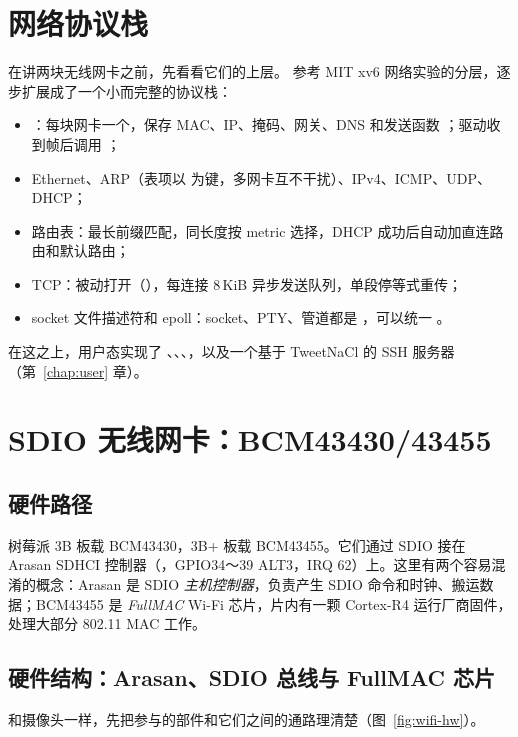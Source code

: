 \section{网络协议栈}

在讲两块无线网卡之前，先看看它们的上层。 参考 MIT xv6 网络实验的分层，逐步扩展成了一个小而完整的协议栈：

\begin{itemize}
  \item {}：每块网卡一个，保存 MAC、IP、掩码、网关、DNS 和发送函数 ；驱动收到帧后调用 ；
  \item Ethernet、ARP（表项以  为键，多网卡互不干扰）、IPv4、ICMP、UDP、DHCP；
  \item 路由表：最长前缀匹配，同长度按 metric 选择，DHCP 成功后自动加直连路由和默认路由；
  \item TCP：被动打开（），每连接 8\,KiB 异步发送队列，单段停等式重传；
  \item socket 文件描述符和 epoll：socket、PTY、管道都是 ，可以统一 。
\end{itemize}

在这之上，用户态实现了 、、、，以及一个基于 TweetNaCl 的 SSH 服务器（第~\ref{chap:user} 章）。

\section{SDIO 无线网卡：BCM43430/43455}

\subsection{硬件路径}

树莓派 3B 板载 BCM43430，3B+ 板载 BCM43455。它们通过 SDIO 接在 Arasan SDHCI 控制器（，GPIO34～39 ALT3，IRQ 62）上。这里有两个容易混淆的概念：Arasan 是 SDIO \emph{主机控制器}，负责产生 SDIO 命令和时钟、搬运数据；BCM43455 是 \emph{FullMAC} Wi-Fi 芯片，片内有一颗 Cortex-R4 运行厂商固件，处理大部分 802.11 MAC 工作。

\subsection{硬件结构：Arasan、SDIO 总线与 FullMAC 芯片}
\label{sec:wifi-hw}

和摄像头一样，先把参与的部件和它们之间的通路理清楚（图~\ref{fig:wifi-hw}）。

